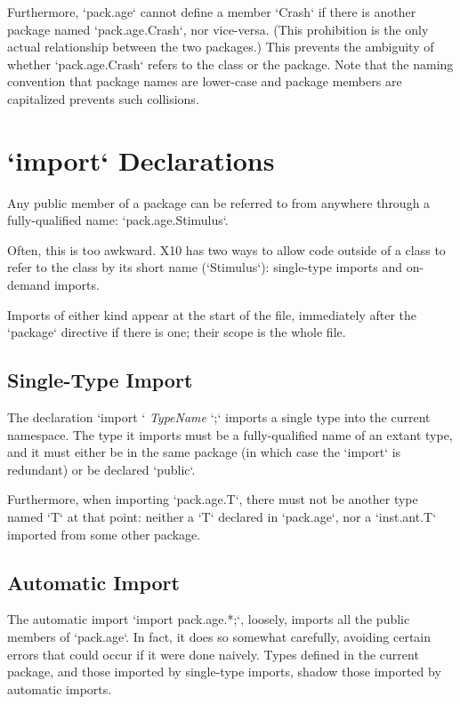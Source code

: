 Furthermore, \xcd`pack.age` cannot define a member \xcd`Crash` if there is
another package named \xcd`pack.age.Crash`, nor vice-versa. (This prohibition
is the only actual relationship between the two packages.)  This prevents the
ambiguity of whether \xcd`pack.age.Crash` refers to the class or the package.  
Note that the naming convention that package names are lower-case and package
members are capitalized prevents such collisions.


\section{\xcd`import` Declarations}

Any public member of a package can be referred to from anywhere through a
fully-qualified name: \xcd`pack.age.Stimulus`.    

Often, this is too awkward.  X10 has two ways to allow code outside of a class
to refer to the class by its short name (\xcd`Stimulus`): single-type imports
and on-demand imports.   

Imports of either kind appear at the start of the file, immediately after the
\xcd`package` directive if there is one; their scope is the whole file.

\subsection{Single-Type Import}

The declaration \xcd`import ` {\em TypeName} \xcd`;` imports a single type
into the current namespace.  The type it imports must be a fully-qualified
name of an extant type, and it must either be in the same package (in which
case the \xcd`import` is redundant) or be declared \xcd`public`.  

Furthermore, when importing \xcd`pack.age.T`, there must not be another type
named \xcd`T` at that point: neither a  \xcd`T` declared in \xcd`pack.age`,
nor a \xcd`inst.ant.T` imported from some other package.

\subsection{Automatic Import}

The automatic import \xcd`import pack.age.*;`, loosely, imports all the public
members of \xcd`pack.age`.  In fact, it does so somewhat carefully, avoiding
certain errors that could occur if it were done naively.  Types defined in the
current package, and those imported by single-type imports, shadow those
imported by automatic imports.  

